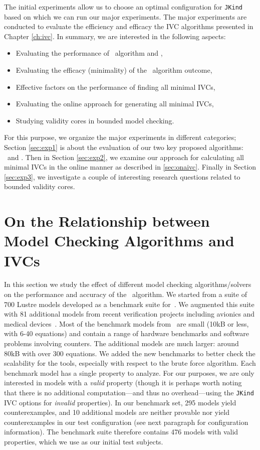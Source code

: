 The initial experiments allow us to choose an optimal configuration for \texttt{JKind} based on which we can run our major experiments. The major experiments are conducted to evaluate the efficiency and efficacy the IVC algorithms presented in Chapter \ref{ch:ivc}.
In summary, we are interested in the following aspects:

\begin{itemize}
  \item Evaluating the performance of \ucalg\ algorithm and \aivcalg ,
  \item Evaluating the efficacy (minimality) of the \ucalg\ algorithm outcome,
  \item Effective factors on the performance of finding all minimal IVCs,
  \item Evaluating the online approach for generating all minimal IVCs,
  \item Studying validity cores in bounded model checking.
\end{itemize}
\noindent For this purpose, we organize the major experiments in different categories; Section \ref{sec:exp1} is about the evaluation of our two key proposed algorithms: \ucalg\ and \aivcalg . Then in Section \ref{sec:exp2}, we examine our approach for calculating all minimal IVCs in the online manner as described in \ref{sec:onaivc}. Finally in Section \ref{sec:exp3}, we investigate a couple of interesting research questions related to bounded validity cores.

\section{On the Relationship between Model Checking Algorithms and IVCs}
\label{sec:exprinit}
In this section we study the effect of different model checking algorithms/solvers on the performance and accuracy of the \ucalg\ algorithm. We started from a suite of 700 Lustre models developed
as a benchmark suite for~\cite{Hagen08:FMCAD}. We augmented this suite
with 81 additional models from recent verification projects including
avionics and medical devices~\cite{QFCS15:backes,hilt2013}. Most of
the benchmark models from~\cite{Hagen08:FMCAD} are small (10kB or less,
with 6-40 equations) and contain a range of hardware benchmarks and
software problems involving counters. The additional models are much
larger: around 80kB with over 300 equations. We added the new
benchmarks to better check the scalability for the tools, especially
with respect to the brute force algorithm.
%
Each benchmark model has a single property to analyze.  For our purposes, we are only interested in models with a {\em valid} property (though it is perhaps worth noting that there is no additional computation---and thus no overhead---using the \texttt{JKind} IVC options for {\em invalid} properties).  In our benchmark set, 295 models yield counterexamples, and 10 additional models are neither provable nor yield counterexamples in our test configuration (see next paragraph for configuration information).  The benchmark suite therefore contains 476 models with valid properties, which we use as our initial test subjects.

